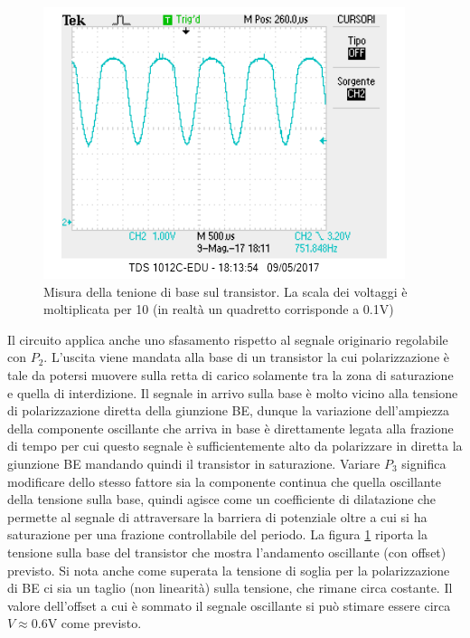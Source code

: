 \documentclass[10pt,a4paper]{article}
\begin{document}
\begin{figure}[!htb]
  \centering
\includegraphics[scale=0.7]{baseq2.png}
\caption{Misura della tenione di base sul transistor. La scala dei voltaggi è moltiplicata per 10 (in realtà un quadretto corrisponde a 0.1V) \label{base}}
\end{figure}


Il circuito applica anche uno sfasamento rispetto al segnale originario regolabile con $P_2$. L'uscita viene mandata alla base di un transistor la cui polarizzazione è tale da potersi muovere sulla retta di carico solamente  tra la zona di saturazione e quella di interdizione. Il segnale in arrivo sulla base è molto vicino alla tensione di polarizzazione diretta della giunzione BE, dunque la variazione dell'ampiezza della componente oscillante che arriva in base è direttamente legata alla frazione di tempo per cui questo segnale è sufficientemente alto da polarizzare in diretta la giunzione BE mandando quindi il transistor in saturazione. Variare $P_3$ significa modificare dello stesso fattore sia la componente continua che quella oscillante della tensione sulla base, quindi agisce come un coefficiente di dilatazione che permette al segnale di attraversare la barriera di potenziale oltre a cui si ha saturazione per una frazione controllabile del periodo. La figura \ref{base} riporta la tensione sulla base del transistor che mostra l'andamento oscillante (con offset) previsto. Si nota anche come superata la tensione di soglia per la polarizzazione di BE ci sia un taglio (non linearità) sulla tensione, che rimane circa costante. Il valore dell'offset a cui è sommato il segnale oscillante si può stimare essere circa $V \approx 0.6$V come previsto.

\end{document}
